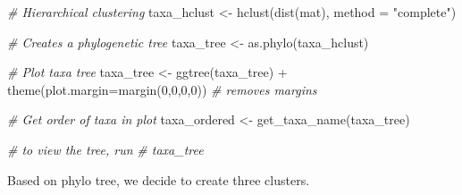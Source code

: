\documentclass[
]{book}
\newenvironment{Shaded}{\begin{snugshade}}{\end{snugshade}}
\newcommand{\AttributeTok}[1]{\textcolor[rgb]{0.77,0.63,0.00}{#1}}
\newcommand{\CommentTok}[1]{\textcolor[rgb]{0.56,0.35,0.01}{\textit{#1}}}
\newcommand{\ConstantTok}[1]{\textcolor[rgb]{0.00,0.00,0.00}{#1}}
\newcommand{\DecValTok}[1]{\textcolor[rgb]{0.00,0.00,0.81}{#1}}
\newcommand{\FunctionTok}[1]{\textcolor[rgb]{0.00,0.00,0.00}{#1}}
\newcommand{\NormalTok}[1]{#1}
\newcommand{\OtherTok}[1]{\textcolor[rgb]{0.56,0.35,0.01}{#1}}
\newcommand{\SpecialCharTok}[1]{\textcolor[rgb]{0.00,0.00,0.00}{#1}}
\newcommand{\StringTok}[1]{\textcolor[rgb]{0.31,0.60,0.02}{#1}}
\begin{document}
\begin{Shaded}
\begin{Highlighting}[]
\CommentTok{\# Hierarchical clustering}
\NormalTok{taxa\_hclust }\OtherTok{\textless{}{-}} \FunctionTok{hclust}\NormalTok{(}\FunctionTok{dist}\NormalTok{(mat), }\AttributeTok{method =} \StringTok{"complete"}\NormalTok{)}

\CommentTok{\# Creates a phylogenetic tree}
\NormalTok{taxa\_tree }\OtherTok{\textless{}{-}} \FunctionTok{as.phylo}\NormalTok{(taxa\_hclust)}

\CommentTok{\# Plot taxa tree}
\NormalTok{taxa\_tree }\OtherTok{\textless{}{-}} \FunctionTok{ggtree}\NormalTok{(taxa\_tree) }\SpecialCharTok{+} 
  \FunctionTok{theme}\NormalTok{(}\AttributeTok{plot.margin=}\FunctionTok{margin}\NormalTok{(}\DecValTok{0}\NormalTok{,}\DecValTok{0}\NormalTok{,}\DecValTok{0}\NormalTok{,}\DecValTok{0}\NormalTok{)) }\CommentTok{\# removes margins}

\CommentTok{\# Get order of taxa in plot}
\NormalTok{taxa\_ordered }\OtherTok{\textless{}{-}} \FunctionTok{get\_taxa\_name}\NormalTok{(taxa\_tree)}

\CommentTok{\# to view the tree, run}
\CommentTok{\# taxa\_tree}
\end{Highlighting}
\end{Shaded}

Based on phylo tree, we decide to create three clusters.

\begin{Shaded}
\end{Shaded}
\end{document}
